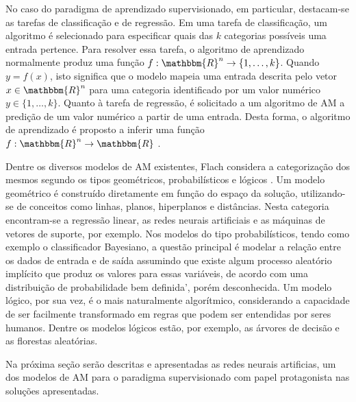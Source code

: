 No caso do paradigma de aprendizado supervisionado, em particular, destacam-se as tarefas de classificação e de regressão. Em uma tarefa de classificação, um algoritmo é selecionado para especificar quais das $k$ categorias possíveis uma entrada pertence. Para resolver essa tarefa, o algoritmo de aprendizado normalmente produz uma função $f : \mathbbm{R}^n \rightarrow \{1, \ldots, k\}$. Quando $y = f(x)$, isto significa que o modelo mapeia uma entrada descrita pelo vetor $x \in \mathbbm{R}^n$ para uma categoria identificado por um valor numérico $y \in \{1, \ldots, k\} $. Quanto à tarefa de regressão, é solicitado a um algoritmo de AM a predição de um valor numérico a partir de uma entrada. Desta forma, o algoritmo de aprendizado é proposto a inferir uma função $f : \mathbbm{R}^n \rightarrow \mathbbm{R}$ \cite{goodfellow}.


Dentre os diversos modelos de AM existentes, Flach considera a categorização dos mesmos segundo os tipos geométricos, probabilísticos e lógicos \cite{flach}. Um modelo geométrico é construído diretamente em função do espaço da solução, utilizando-se de conceitos como linhas, planos, hiperplanos e distâncias. Nesta categoria encontram-se a regressão linear, as redes neurais artificiais e as máquinas de vetores de suporte, por exemplo. Nos modelos do tipo probabilísticos, tendo como exemplo o classificador Bayesiano, a questão principal é modelar a relação entre os dados de entrada e de saída assumindo que existe algum processo aleatório implícito que produz os valores para essas variáveis, de acordo com uma distribuição de probabilidade bem definida', porém desconhecida. Um modelo lógico, por sua vez, é o mais naturalmente algorítmico, considerando a capacidade de ser facilmente transformado em regras que podem ser entendidas por seres humanos. Dentre os modelos lógicos estão, por exemplo, as árvores de decisão e as florestas aleatórias.


Na próxima seção serão descritas e apresentadas as redes neurais artificias, um dos modelos de AM para o paradigma supervisionado com papel protagonista nas soluções apresentadas.


